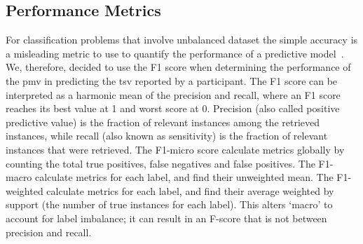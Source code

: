 \subsection{Performance Metrics}\label{subsec:performance-metrics}
For classification problems that involve unbalanced dataset the simple accuracy is a misleading metric to use to quantify the performance of a predictive model~\cite{Chawla2005}.
We, therefore, decided to use the F1 score when determining the performance of the \ac{pmv} in predicting the \ac{tsv} reported by a participant.
The F1 score can be interpreted as a harmonic mean of the precision and recall, where an F1 score reaches its best value at 1 and worst score at 0.
Precision (also called positive predictive value) is the fraction of relevant instances among the retrieved instances, while recall (also known as sensitivity) is the fraction of relevant instances that were retrieved.
The F1-micro score calculate metrics globally by counting the total true positives, false negatives and false positives.
The F1-macro calculate metrics for each label, and find their unweighted mean.
The F1-weighted calculate metrics for each label, and find their average weighted by support (the number of true instances for each label).
This alters ‘macro’ to account for label imbalance; it can result in an F-score that is not between precision and recall.
